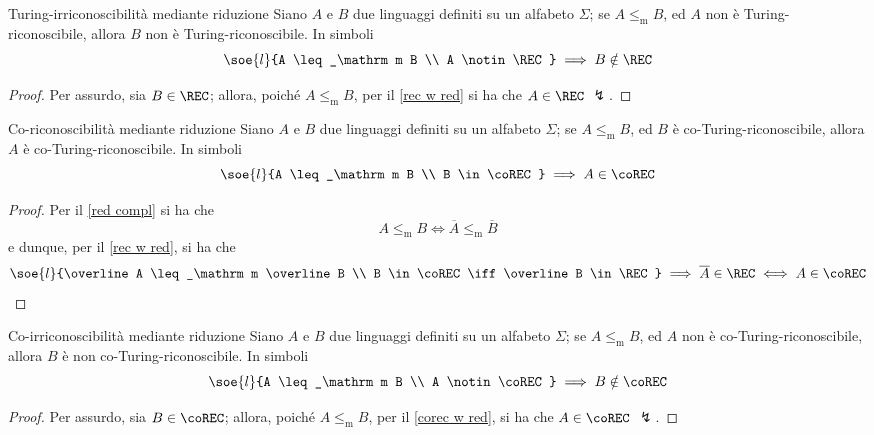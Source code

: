 \documentclass[a4paper, 12pt]{report}
\begin{document}
    \begin{framedcor}[label={rec w red cor}]{Turing-irriconoscibilità mediante riduzione}
        Siano $A$ e $B$ due linguaggi definiti su un alfabeto $\Sigma$; se $A \leq_\mathrm m B$, ed $A$ non è Turing-riconoscibile, allora $B$ non è Turing-riconoscibile. In simboli $$\soe{l}{A \leq_\mathrm m B \\ A \notin \REC} \implies B \notin \REC$$
    \end{framedcor}

    \begin{proof}
        Per assurdo, sia $B \in \REC$; allora, poiché $A \leq_\mathrm m B$, per il \cref{rec w red} si ha che $A \in \REC$ $\lightning$.
    \end{proof}

    \begin{framedcor}[label={corec w red}]{Co-riconoscibilità mediante riduzione}
        Siano $A$ e $B$ due linguaggi definiti su un alfabeto $\Sigma$; se $A \leq_\mathrm m B$, ed $B$ è co-Turing-riconoscibile, allora $A$ è co-Turing-riconoscibile. In simboli $$\soe{l}{A \leq_\mathrm m B \\ B \in \coREC} \implies A \in \coREC$$
    \end{framedcor}

    \begin{proof}
        Per il \cref{red compl} si ha che $$A \leq_\mathrm m B \iff \overline{A} \leq_\mathrm m \overline B$$ e dunque, per il \cref{rec w red}, si ha che $$\soe{l}{\overline A \leq_\mathrm m \overline B \\ B \in \coREC \iff \overline B \in \REC} \implies \overline A \in \REC \iff A \in \coREC$$ 
    \end{proof}

    \begin{framedcor}[label={corec w red cor}]{Co-irriconoscibilità mediante riduzione}
        Siano $A$ e $B$ due linguaggi definiti su un alfabeto $\Sigma$; se $A \leq_\mathrm m B$, ed $A$ non è co-Turing-riconoscibile, allora $B$ è non co-Turing-riconoscibile. In simboli $$\soe{l}{A \leq_\mathrm m B \\ A \notin \coREC} \implies B \notin \coREC$$
    \end{framedcor}

    \begin{proof}
        Per assurdo, sia $B \in \coREC$; allora, poiché $A \leq_\mathrm m B$, per il \cref{corec w red}, si ha che $A \in \coREC$ $\lightning$.
    \end{proof}
\end{document}
